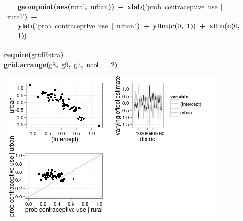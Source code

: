 \documentclass{article}
\makeatletter
\newcommand{\hlnumber}[1]{\textcolor[rgb]{0,0,0}{#1}}%
\newcommand{\hlfunctioncall}[1]{\textcolor[rgb]{.5,0,.33}{\textbf{#1}}}%
\newcommand{\hlstring}[1]{\textcolor[rgb]{.6,.6,1}{#1}}%
\newcommand{\hlkeyword}[1]{\textbf{#1}}%
\newcommand{\hlargument}[1]{\textcolor[rgb]{.69,.25,.02}{#1}}%
\newcommand{\hlsymbol}[1]{#1}%
\newcommand{\hlstd}[1]{\textcolor[rgb]{0,0,0}{#1}}%
\newenvironment{kframe}{%
 \def\FrameCommand##1{\hskip\@totalleftmargin \hskip-\fboxsep
 \colorbox{shadecolor}{##1}\hskip-\fboxsep
     \hskip-\linewidth \hskip-\@totalleftmargin \hskip\columnwidth}%
 \MakeFramed {\advance\hsize-\width
   \@totalleftmargin\z@ \linewidth\hsize
   \@setminipage}}%
 {\par\unskip\endMakeFramed}
\newenvironment{knitrout}{}{} %
\makeatother
\begin{document}
\begin{knitrout}
{\begin{kframe}
\begin{flushleft}
\hlstd{}{\ }{\ }{\ }{\ }\hlfunctioncall{geom\usebox{\hlnormalsizeboxunderscore}point}\hlkeyword{(}\hlfunctioncall{aes}\hlkeyword{(}\hlsymbol{rural}\hlkeyword{,}{\ }\hlsymbol{urban}\hlkeyword{)}\hlkeyword{)}{\ }\hlkeyword{+}{\ }\hlfunctioncall{xlab}\hlkeyword{(}\hlstring{"{}prob{\ }contraceptive{\ }use{\ }|{\ }rural"{}}\hlkeyword{)}{\ }\hlkeyword{+}\hspace*{\fill}\\
\hlstd{}{\ }{\ }{\ }{\ }\hlfunctioncall{ylab}\hlkeyword{(}\hlstring{"{}prob{\ }contraceptive{\ }use{\ }|{\ }urban"{}}\hlkeyword{)}{\ }\hlkeyword{+}{\ }\hlfunctioncall{ylim}\hlkeyword{(}\hlfunctioncall{c}\hlkeyword{(}\hlnumber{0}\hlkeyword{,}{\ }\hlnumber{1}\hlkeyword{)}\hlkeyword{)}{\ }\hlkeyword{+}{\ }\hlfunctioncall{xlim}\hlkeyword{(}\hlfunctioncall{c}\hlkeyword{(}\hlnumber{0}\hlkeyword{,}\hspace*{\fill}\\
\hlstd{}{\ }{\ }{\ }{\ }\hlnumber{1}\hlkeyword{)}\hlkeyword{)}\hspace*{\fill}\\
\hlstd{}\hspace*{\fill}\\
\hlstd{}\hlfunctioncall{require}\hlkeyword{(}\hlsymbol{gridExtra}\hlkeyword{)}\hspace*{\fill}\\
\hlstd{}\hlfunctioncall{grid.arrange}\hlkeyword{(}\hlsymbol{g8}\hlkeyword{,}{\ }\hlsymbol{g9}\hlkeyword{,}{\ }\hlsymbol{g7}\hlkeyword{,}{\ }\hlargument{ncol}{\ }\hlargument{=}{\ }\hlnumber{2}\hlkeyword{)}\mbox{}
\normalfont
\end{flushleft}


\centering{}\includegraphics{urban-model} 

\end{kframe}}
\end{knitrout}
\end{document}
